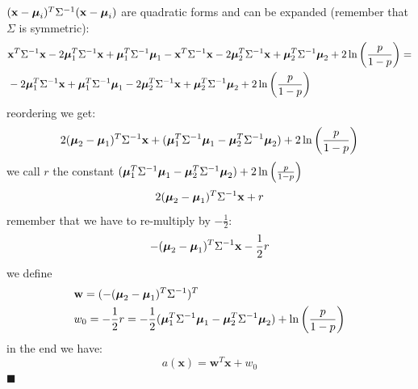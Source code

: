 \documentclass[10pt, letterpaper]{report}
\begin{document}
$(\mathbf x-{\boldsymbol{\mu}}_i)^T\Sigma^{-1}(\mathbf x-{\boldsymbol{\mu}}_i)$ are quadratic forms and can be expanded (remember that $\Sigma$ is symmetric):
\begin{align}
	 & \mathbf x^T\Sigma^{-1}\mathbf x-2{\boldsymbol{\mu}}_1^T\Sigma^{-1}\mathbf x+{\boldsymbol{\mu}}_1^T\Sigma^{-1}{\boldsymbol{\mu}}_1
	-
	\mathbf x^T\Sigma^{-1}\mathbf x-2{\boldsymbol{\mu}}_2^T\Sigma^{-1}\mathbf x+{\boldsymbol{\mu}}_2^T\Sigma^{-1}{\boldsymbol{\mu}}_2
	+
	2\ln\left(\frac{p}{1-p}\right)=                                                            \\
	 & -2{\boldsymbol{\mu}}_1^T\Sigma^{-1}\mathbf x+{\boldsymbol{\mu}}_1^T\Sigma^{-1}{\boldsymbol{\mu}}_1
	-2{\boldsymbol{\mu}}_2^T\Sigma^{-1}\mathbf x+{\boldsymbol{\mu}}_2^T\Sigma^{-1}{\boldsymbol{\mu}}_2
	+
	2\ln\left(\frac{p}{1-p}\right)
\end{align}
reordering we get:\begin{equation}
	2({\boldsymbol{\mu}}_2-{\boldsymbol{\mu}}_1)^T\Sigma^{-1}\mathbf x+({\boldsymbol{\mu}}_1^T\Sigma^{-1}{\boldsymbol{\mu}}_1-{\boldsymbol{\mu}}_2^T\Sigma^{-1}{\boldsymbol{\mu}}_2)+
	2\ln\left(\frac{p}{1-p}\right)
\end{equation}
we call $r$ the constant $({\boldsymbol{\mu}}_1^T\Sigma^{-1}{\boldsymbol{\mu}}_1-{\boldsymbol{\mu}}_2^T\Sigma^{-1}{\boldsymbol{\mu}}_2)+
	2\ln\left(\frac{p}{1-p}\right)$
\begin{equation}
	2({\boldsymbol{\mu}}_2-{\boldsymbol{\mu}}_1)^T\Sigma^{-1}\mathbf x+r
\end{equation}
remember that we have to re-multiply by $-\frac{1}{2}$:
\begin{equation}
	-({\boldsymbol{\mu}}_2-{\boldsymbol{\mu}}_1)^T\Sigma^{-1}\mathbf x-\frac{1}{2}r
\end{equation}
we define\begin{align}
	 & \mathbf w=(-({\boldsymbol{\mu}}_2-{\boldsymbol{\mu}}_1)^T\Sigma^{-1})^T                                           \\
	 & w_0=-\frac{1}{2}r=-\frac{1}{2} ({\boldsymbol{\mu}}_1^T\Sigma^{-1}{\boldsymbol{\mu}}_1-{\boldsymbol{\mu}}_2^T\Sigma^{-1}{\boldsymbol{\mu}}_2)+
	\ln\left(\frac{p}{1-p}\right)
\end{align}
in the end we have:\begin{equation}
	a(\mathbf x)=\mathbf w^T\mathbf x+w_0
\end{equation}
\hfill$\blacksquare$
\end{document}
